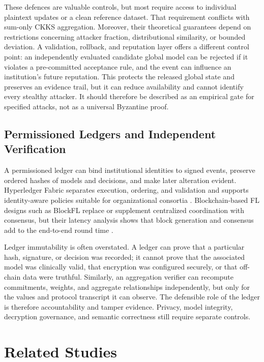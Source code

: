 These defences are valuable controls, but most require access to individual plaintext updates or a clean reference dataset. That requirement conflicts with sum-only CKKS aggregation. Moreover, their theoretical guarantees depend on restrictions concerning attacker fraction, distributional similarity, or bounded deviation. A validation, rollback, and reputation layer offers a different control point: an independently evaluated candidate global model can be rejected if it violates a pre-committed acceptance rule, and the event can influence an institution's future reputation. This protects the released global state and preserves an evidence trail, but it can reduce availability and cannot identify every stealthy attacker. It should therefore be described as an empirical gate for specified attacks, not as a universal Byzantine proof.

\subsection{Permissioned Ledgers and Independent Verification}

A permissioned ledger can bind institutional identities to signed events, preserve ordered hashes of models and decisions, and make later alteration evident. Hyperledger Fabric separates execution, ordering, and validation and supports identity-aware policies suitable for organizational consortia \cite{androulaki2018hyperledger}. Blockchain-based FL designs such as BlockFL replace or supplement centralized coordination with consensus, but their latency analysis shows that block generation and consensus add to the end-to-end round time \cite{kim2020blockfl}.

Ledger immutability is often overstated. A ledger can prove that a particular hash, signature, or decision was recorded; it cannot prove that the associated model was clinically valid, that encryption was configured securely, or that off-chain data were truthful. Similarly, an aggregation verifier can recompute commitments, weights, and aggregate relationships independently, but only for the values and protocol transcript it can observe. The defensible role of the ledger is therefore accountability and tamper evidence. Privacy, model integrity, decryption governance, and semantic correctness still require separate controls.

\section{Related Studies}
\label{sec:related-studies}

